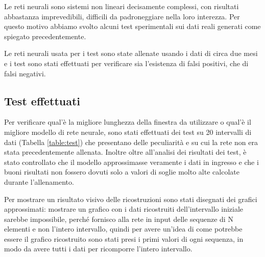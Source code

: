 Le reti neurali sono sistemi non lineari decisamente complessi, con risultati abbastanza imprevedibili, difficili da padroneggiare nella loro interezza. Per questo motivo abbiamo svolto alcuni test sperimentali sui dati reali generati come spiegato precedentemente.

Le reti neurali usata per i test sono state allenate usando i dati di circa due mesi e i test sono stati effettuati per verificare sia l'esistenza di falsi positivi, che di falsi negativi.

\subsection{Test effettuati}

Per verificare qual'è la migliore lunghezza della finestra da utilizzare o qual'è il migliore modello di rete neurale, sono stati effettuati dei test su 20 intervalli di dati (Tabella \ref{table:test}) che presentano delle peculiarità e su cui la rete non era stata precedentemente allenata. Inoltre oltre all'analisi dei risultati dei test, è stato controllato che il modello approssimasse veramente i dati in ingresso e che i buoni risultati non fossero dovuti solo a valori di soglie molto alte calcolate durante l'allenamento.

Per mostrare un risultato visivo delle ricostruzioni sono stati disegnati dei grafici approssimati: mostrare un grafico con i dati ricostruiti dell'intervallo iniziale sarebbe impossibile, perché fornisco alla rete in input delle sequenze di N elementi e non l'intero intervallo, quindi per avere un'idea di come potrebbe essere il grafico ricostruito sono stati presi i primi valori di ogni sequenza, in modo da avere tutti i dati per ricomporre l'intero intervallo.


